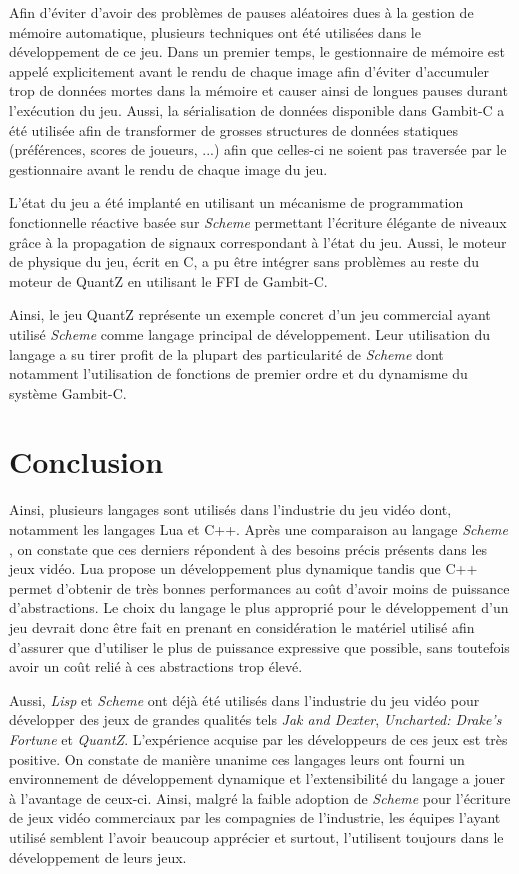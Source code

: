 \documentclass[12pt,twoside,letterpaper,francais]{book}
\newcommand{\lisp}{{\textit{Lisp }}}
\newcommand{\Schemelang}{{\textit{Scheme }}}
\begin{document}
Afin d'éviter d'avoir des problèmes de pauses aléatoires dues à la
gestion de mémoire automatique, plusieurs techniques ont été utilisées
dans le développement de ce jeu. Dans un premier temps, le
gestionnaire de mémoire est appelé explicitement avant le rendu de
chaque image afin d'éviter d'accumuler trop de données mortes dans la
mémoire et causer ainsi de longues pauses durant l'exécution du
jeu. Aussi, la sérialisation de données disponible dans Gambit-C a été
utilisée afin de transformer de grosses structures de données
statiques (préférences, scores de joueurs, ...) afin que celles-ci ne
soient pas traversée par le gestionnaire avant le rendu de chaque
image du jeu.

L'état du jeu a été implanté en utilisant un mécanisme de
programmation fonctionnelle réactive basée sur \Schemelang permettant
l'écriture élégante de niveaux grâce à la propagation de signaux
correspondant à l'état du jeu. Aussi, le moteur de physique du jeu,
écrit en C, a pu être intégrer sans problèmes au reste du moteur de
QuantZ en utilisant le FFI de Gambit-C.

Ainsi, le jeu QuantZ représente un exemple concret d'un jeu commercial
ayant utilisé \Schemelang comme langage principal de développement. Leur
utilisation du langage a su tirer profit de la plupart des
particularité de \Schemelang dont notamment l'utilisation de fonctions de
premier ordre et du dynamisme du système Gambit-C.


\FloatBarrier
\section{Conclusion}
Ainsi, plusieurs langages sont utilisés dans l'industrie du jeu vidéo
dont, notamment les langages Lua et C++. Après une comparaison au
langage \Schemelang, on constate que ces derniers répondent à des
besoins précis présents dans les jeux vidéo. Lua propose un
développement plus dynamique tandis que C++ permet d'obtenir de très
bonnes performances au coût d'avoir moins de puissance
d'abstractions. Le choix du langage le plus approprié pour le
développement d'un jeu devrait donc être fait en prenant en
considération le matériel utilisé afin d'assurer que d'utiliser le
plus de puissance expressive que possible, sans toutefois avoir un
coût relié à ces abstractions trop élevé.

Aussi, \lisp et \Schemelang ont déjà été utilisés dans l'industrie du jeu
vidéo pour développer des jeux de grandes qualités tels \textit{Jak
  and Dexter}, \textit{Uncharted: Drake's Fortune} et
\textit{QuantZ}. L'expérience acquise par les développeurs de ces jeux
est très positive. On constate de manière unanime ces langages leurs
ont fourni un environnement de développement dynamique et
l'extensibilité du langage a jouer à l'avantage de ceux-ci. Ainsi,
malgré la faible adoption de \Schemelang pour l'écriture de jeux vidéo
commerciaux par les compagnies de l'industrie, les équipes l'ayant
utilisé semblent l'avoir beaucoup apprécier et surtout, l'utilisent
toujours dans le développement de leurs jeux.
\end{document}
